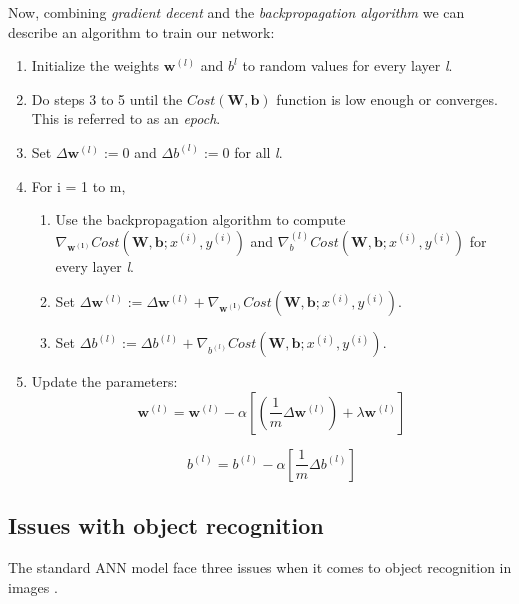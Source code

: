 Now, combining \textit{gradient decent} and the \textit{backpropagation algorithm} we can describe an algorithm to train our network: 

\begin{enumerate}
	\item Initialize the weights $ \mathbf{w}^{(l)} $ and $ b^{l} $ to random values for every layer \textit{l}.
	\item Do steps 3 to 5 until the $ Cost(\mathbf{W, b}) $ function is low enough or converges. This is referred to as an \textit{epoch}. 
	\item Set $ \Delta\mathbf{w}^{(l)} := 0 $ and $ \Delta b^{(l)} := 0 $ for all \textit{l}.
	\item For i = 1 to m,
		\begin{enumerate}
			\item Use the backpropagation algorithm to compute $ \nabla_\mathbf{w^{(l)}}Cost(\mathbf{W, b};x^{(i)},y^{(i)}) $ and $ \nabla_b^{(l)}Cost(\mathbf{W, b};x^{(i)},y^{(i)}) $ for every layer \textit{l}.
			\item  Set $ \Delta\mathbf{w}^{(l)} := \Delta\mathbf{w}^{(l)} + \nabla_\mathbf{w^{(l)}}Cost(\mathbf{W, b};x^{(i)},y^{(i)}) $. 
			\item  Set $ \Delta b^{(l)} := \Delta b^{(l)} + \nabla_{b^{(l)}}Cost(\mathbf{W, b};x^{(i)},y^{(i)}) $. 
		\end{enumerate}
	\item Update the parameters:
		\begin{equation*}
			\mathbf{w}^{(l)} = \mathbf{w}^{(l)} - \alpha[(\frac{1}{m}\Delta\mathbf{w}^{(l)}) + \lambda\mathbf{w}^{(l)}]
		\end{equation*}
		
		\begin{equation*}
			b^{(l)} = b^{(l)} - \alpha[\frac{1}{m}\Delta b^{(l)}]
		\end{equation*}
\end{enumerate}

\subsection{Issues with object recognition}\label{ann_issues}

The standard ANN model face three issues when it comes to object recognition in images \cite{LeCun1998}. 

